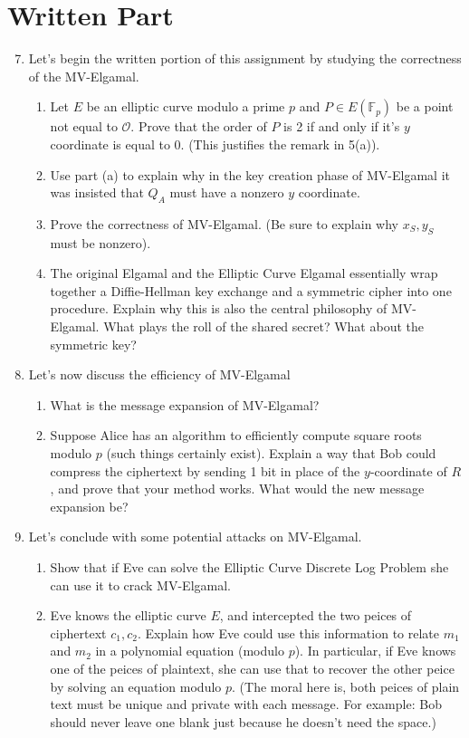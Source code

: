 \documentclass[11pt]{article}
\newcommand{\bF}{\mathbb{F}}
\newcommand{\cO}{\mathcal{O}}
\begin{document}
\section*{Written Part}
\begin{enumerate}
  \setcounter{enumi}{6}
  \item{Let's begin the written portion of this assignment by studying the correctness of the MV-Elgamal.
  \begin{enumerate}
    \item{
    Let $E$ be an elliptic curve modulo a prime $p$ and $P\in E(\bF_p)$ be a point not equal to $\cO$.  Prove that the order of $P$ is 2 if and only if it's $y$ coordinate is equal to 0.  (This justifies the remark in 5(a)).
    }
    \item{
    Use part (a) to explain why in the key creation phase of MV-Elgamal it was insisted that $Q_A$ must have a nonzero $y$ coordinate.
    }
    \item{
    Prove the correctness of MV-Elgamal.  (Be sure to explain why $x_S,y_S$ must be nonzero).
    }
    \item{
    The original Elgamal and the Elliptic Curve Elgamal essentially wrap together a Diffie-Hellman key exchange and a symmetric cipher into one procedure.  Explain why this is also the central philosophy of MV-Elgamal.  What plays the roll of the shared secret?  What about the symmetric key?
    }
  \end{enumerate}
  }
  \item{Let's now discuss the efficiency of MV-Elgamal
  \begin{enumerate}
    \item{
    What is the message expansion of MV-Elgamal?
    }
    \item{
    Suppose Alice has an algorithm to efficiently compute square roots modulo $p$ (such things certainly exist).  Explain a way that Bob could compress the ciphertext by sending 1 bit in place of the $y$-coordinate of $R$, and prove that your method works.  What would the new message expansion be?
    }
  \end{enumerate}
  }
  \item{
  Let's conclude with some potential attacks on MV-Elgamal.
  \begin{enumerate}
    \item{
    Show that if Eve can solve the Elliptic Curve Discrete Log Problem she can use it to crack MV-Elgamal.
    }
    \item{
    Eve knows the elliptic curve $E$, and intercepted the two peices of ciphertext $c_1,c_2$.  Explain how Eve could use this information to relate $m_1$ and $m_2$ in a polynomial equation (modulo $p$).  In particular, if Eve knows one of the peices of plaintext, she can use that to recover the other peice by solving an equation modulo $p$.  (The moral here is, both peices of plain text must be unique and private with each message.  For example: Bob should never leave one blank just because he doesn't need the space.)
    }
  \end{enumerate}
  }
\end{enumerate}
\end{document}
